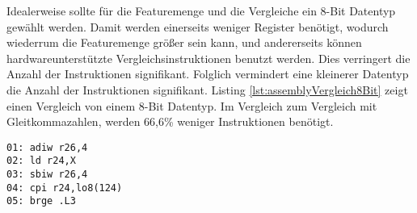 Idealerweise sollte für die Featuremenge und die Vergleiche ein 8-Bit Datentyp gewählt werden. Damit werden einerseits weniger Register benötigt, wodurch wiederrum die Featuremenge größer sein kann,
und andererseits können hardwareunterstützte Vergleichsinstruktionen benutzt werden. Dies verringert die Anzahl der Instruktionen signifikant. Folglich vermindert eine kleinerer Datentyp die Anzahl der
Instruktionen signifikant. Listing \ref{lst:assemblyVergleich8Bit} zeigt einen Vergleich von einem 8-Bit Datentyp. Im Vergleich zum Vergleich mit Gleitkommazahlen, werden 66,6\% weniger Instruktionen
benötigt.
\begin{lstlisting}[label=lst:assemblyVergleich8Bit,caption={Vergleich von 8-Bit-Feature mit konstanter 8-Bit Zahl.}]
01: adiw r26,4
02: ld r24,X
03: sbiw r26,4
04: cpi r24,lo8(124)
05: brge .L3
\end{lstlisting}